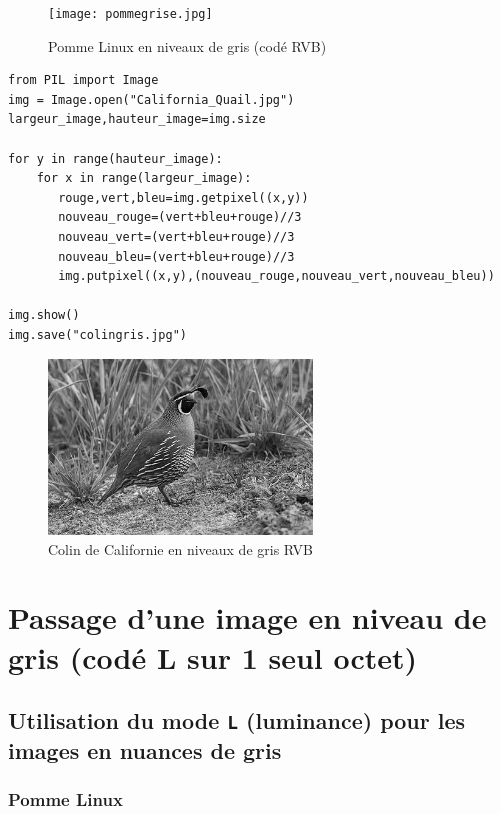 \documentclass[11pt]{article}
\begin{document}
\begin{figure}[htbp]
\centering
\texttt{[image: pommegrise.jpg]}
\caption{Pomme Linux en niveaux de gris (codé RVB)}
\end{figure}



\begin{verbatim}
from PIL import Image
img = Image.open("California_Quail.jpg")
largeur_image,hauteur_image=img.size

for y in range(hauteur_image):
    for x in range(largeur_image):
       rouge,vert,bleu=img.getpixel((x,y))
       nouveau_rouge=(vert+bleu+rouge)//3
       nouveau_vert=(vert+bleu+rouge)//3
       nouveau_bleu=(vert+bleu+rouge)//3
       img.putpixel((x,y),(nouveau_rouge,nouveau_vert,nouveau_bleu))

img.show()
img.save("colingris.jpg")
\end{verbatim}

\begin{figure}[htbp]
\centering
\includegraphics[width=7cm]{colingris.jpg}
\caption{Colin de Californie en niveaux de gris RVB}
\end{figure}

\section{Passage d'une image en niveau de gris (codé L sur 1 seul octet)}
\label{sec:org4fa7872}


\subsection{Utilisation du mode \texttt{L} (luminance) pour les images en nuances de gris}
\label{sec:org306e7aa}

\subsubsection{Pomme Linux}
\label{sec:org76578d9}
\end{document}

